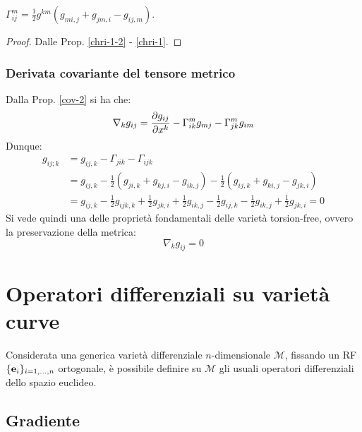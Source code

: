 \begin{proposition}\label{levi-civita}
	$ \Gamma^m_{ij} = \frac{1}{2} g^{km} \left( g_{mi,j} + g_{jm,i} - g_{ij,m} \right) $.
\end{proposition}
\begin{proof}
	Dalle Prop. \ref{chri-1-2} - \ref{chri-1}.
\end{proof}

\subsubsection{Derivata covariante del tensore metrico}

Dalla Prop. \ref{cov-2} si ha che:
\begin{equation}
	\nabla_k g_{ij} = \frac{\partial g_{ij}}{\partial x^k} - \Gamma^m_{ik} g_{mj} - \Gamma^m_{jk} g_{im}
	\label{eq:4.15}
\end{equation}
Dunque:
\begin{equation*}
	\begin{split}
		g_{ij;k}
		&= g_{ij,k} - \Gamma_{jik} - \Gamma_{ijk}\\
		&= g_{ij,k} - \frac{1}{2} \left( g_{ji,k} + g_{kj,i} - g_{ik,j} \right) - \frac{1}{2} \left( g_{ij,k} + g_{ki,j} - g_{jk,i} \right)\\
		&= g_{ij,k} - \frac{1}{2} g_{ijk,k} + \frac{1}{2} g_{jk,i} + \frac{1}{2} g_{ik,j} - \frac{1}{2} g_{ij,k} - \frac{1}{2} g_{ik,j} + \frac{1}{2} g_{jk,i} = 0
	\end{split}
\end{equation*}
Si vede quindi una delle proprietà fondamentali delle varietà torsion-free, ovvero la preservazione della metrica:
\begin{equation}
	\nabla_k g_{ij} = 0
	\label{eq:4.16}
\end{equation}

\section{Operatori differenziali su varietà curve}

Considerata una generica varietà differenziale $ n $-dimensionale $ \mathcal{M} $, fissando un RF $ \{\mathbf{e}_i\}_{i = 1, \dots, n} $ ortogonale, è possibile definire su $ \mathcal{M} $ gli usuali operatori differenziali dello spazio euclideo.

\subsection{Gradiente}


